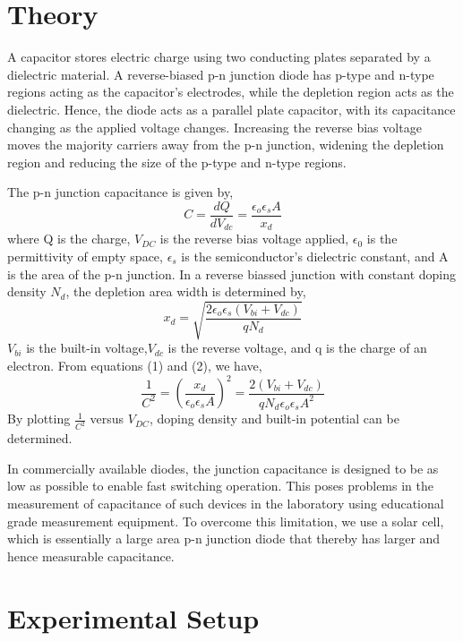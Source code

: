 \section{Theory}
A capacitor stores electric charge using two conducting plates separated by a dielectric material. A reverse-biased p-n junction diode has p-type and n-type regions acting as the capacitor's electrodes, while the depletion region acts as the dielectric. Hence, the diode acts as a parallel plate capacitor, with its capacitance changing as the applied voltage changes. Increasing the reverse bias voltage moves the majority carriers away from the p-n junction, widening the depletion region and reducing the size of the p-type and n-type regions.

The p-n junction capacitance is given by,
\begin{equation}
    C=\frac{dQ}{dV_{dc}}=\frac{\epsilon_o \epsilon_s A}{x_d}
    \label{eq:1}
\end{equation}
where Q is the charge, $V_{DC}$ is the reverse bias voltage applied, $\epsilon_0$ is the permittivity of empty space, $\epsilon_s$ is the semiconductor's dielectric constant, and A is the area of the p-n junction. In a reverse biassed junction with constant doping density $N_d$, the depletion area width is determined by,
\begin{equation}
    x_d=\sqrt{\frac{2 \epsilon_o \epsilon_s (V_{bi}+V_{dc})}{qN_d}}
    \label{eq:2}
\end{equation}
$V_{bi}$ is the built-in voltage,$V_{dc}$ is the reverse voltage, and q is the charge of an electron. From equations (1) and (2), we have,
\begin{equation}
    \frac{1}{C^2}=\left(\frac{x_d}{\epsilon_o \epsilon_s A}\right)^2=\frac{2 (V_{bi}+V_{dc})}{q N_d \epsilon_o \epsilon_s A^2}
    \label{eq:3}
\end{equation}
By plotting $\frac{1}{C^2}$ versus $V_{DC}$, doping density and built-in potential can be determined.

In commercially available diodes, the
junction capacitance is designed to be as low as possible to
enable fast switching operation. This poses problems in the
measurement of capacitance of such devices in the laboratory using educational grade measurement equipment. To
overcome this limitation, we use a solar cell, which is essentially a large area p-n junction diode that thereby has larger
and hence measurable capacitance.
\section{Experimental Setup}

